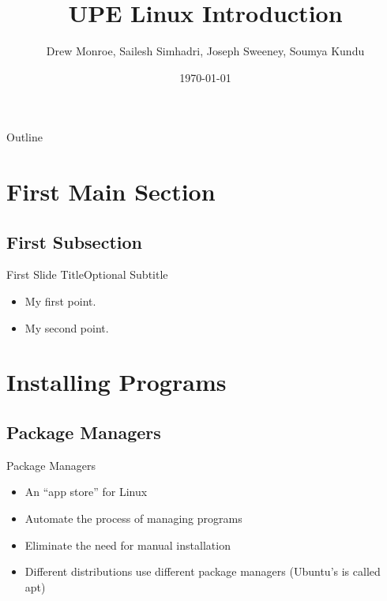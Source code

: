 \documentclass{beamer}
\title{UPE Linux Introduction}
\author{Drew Monroe, Sailesh Simhadri, Joseph Sweeney, Soumya Kundu}
\institute[Upsilon Pi Epsilon - University of Connecticut]
\date{\today}
\begin{document}
\begin{frame}
  \titlepage
\end{frame}

\begin{frame}{Outline}
  \tableofcontents
\end{frame}


\section{First Main Section}

\subsection{First Subsection}

\begin{frame}{First Slide Title}{Optional Subtitle}
  \begin{itemize}
  \item {
    My first point.
  }
  \item {
    My second point.
  }
  \end{itemize}
\end{frame}

\section{Installing Programs}

\subsection{Package Managers}

\begin{frame}{Package Managers}
    \begin{itemize}
        \item An ``app store'' for Linux
        \item Automate the process of managing programs
        \item Eliminate the need for manual installation
        \item Different distributions use different package managers (Ubuntu's is called apt)
    \end{itemize}
\end{frame}
\end{document}
